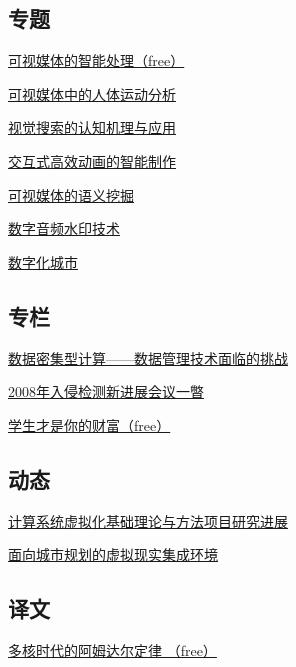 \documentclass[a4paper]{article}
\begin{document}
\subsection{专题}
\href{http://history.ccf.org.cn/resources/1190201776262/2010/04/15/041006.pdf}{可视媒体的智能处理（free）}

\href{http://history.ccf.org.cn/resources/1190201776262/2010/04/15/041007.pdf}{可视媒体中的人体运动分析}

\href{http://history.ccf.org.cn/resources/1190201776262/2010/04/15/041017.pdf}{视觉搜索的认知机理与应用}

\href{http://history.ccf.org.cn/resources/1190201776262/2010/04/15/041023.pdf}{交互式高效动画的智能制作}

\href{http://history.ccf.org.cn/resources/1190201776262/2010/04/15/041030.pdf}{可视媒体的语义挖掘}

\href{http://history.ccf.org.cn/resources/1190201776262/2010/04/15/041037.pdf}{数字音频水印技术}

\href{http://history.ccf.org.cn/resources/1190201776262/2010/04/15/041044.pdf}{数字化城市}

\subsection{专栏}
\href{http://history.ccf.org.cn/resources/1190201776262/2010/04/15/041050.pdf}{数据密集型计算——数据管理技术面临的挑战}

\href{http://history.ccf.org.cn/resources/1190201776262/2010/04/15/041054.pdf}{2008年入侵检测新进展会议一暼}

\href{http://history.ccf.org.cn/resources/1190201776262/2010/04/15/041060.pdf}{学生才是你的财富（free）}

\subsection{动态}
\href{http://history.ccf.org.cn/resources/1190201776262/2010/04/15/041066.pdf}{计算系统虚拟化基础理论与方法项目研究进展}

\href{http://history.ccf.org.cn/resources/1190201776262/2010/04/15/041071.pdf}{面向城市规划的虚拟现实集成环境}

\subsection{译文}
\href{http://history.ccf.org.cn/resources/1190201776262/2010/04/15/041074.pdf}{多核时代的阿姆达尔定律 （free）}
\end{document}
